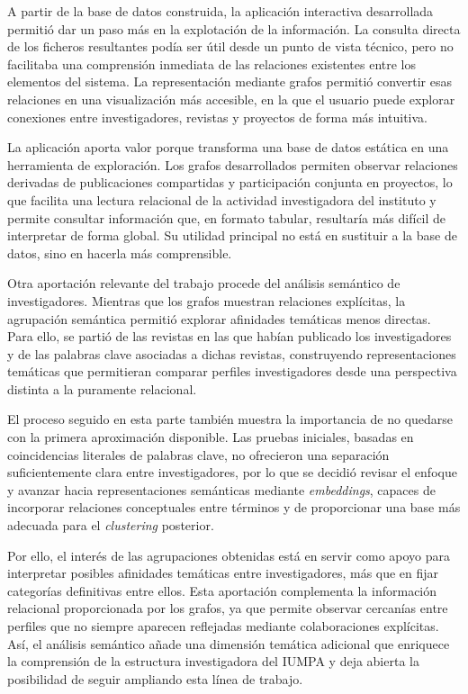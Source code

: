 \documentclass[11pt,spanish,listoffigures,listoftables]{tfgetsinf}
\begin{document}
A partir de la base de datos construida, la aplicación interactiva desarrollada permitió dar un paso más en la explotación de la información. La consulta directa de los ficheros resultantes podía ser útil desde un punto de vista técnico, pero no facilitaba una comprensión inmediata de las relaciones existentes entre los elementos del sistema. La representación mediante grafos permitió convertir esas relaciones en una visualización más accesible, en la que el usuario puede explorar conexiones entre investigadores, revistas y proyectos de forma más intuitiva.

La aplicación aporta valor porque transforma una base de datos estática en una herramienta de exploración. Los grafos desarrollados permiten observar relaciones derivadas de publicaciones compartidas y participación conjunta en proyectos, lo que facilita una lectura relacional de la actividad investigadora del instituto y permite consultar información que, en formato tabular, resultaría más difícil de interpretar de forma global. Su utilidad principal no está en sustituir a la base de datos, sino en hacerla más comprensible.

Otra aportación relevante del trabajo procede del análisis semántico de investigadores. Mientras que los grafos muestran relaciones explícitas, la agrupación semántica permitió explorar afinidades temáticas menos directas. Para ello, se partió de las revistas en las que habían publicado los investigadores y de las palabras clave asociadas a dichas revistas, construyendo representaciones temáticas que permitieran comparar perfiles investigadores desde una perspectiva distinta a la puramente relacional.

El proceso seguido en esta parte también muestra la importancia de no quedarse con la primera aproximación disponible. Las pruebas iniciales, basadas en coincidencias literales de palabras clave, no ofrecieron una separación suficientemente clara entre investigadores, por lo que se decidió revisar el enfoque y avanzar hacia representaciones semánticas mediante \textit{embeddings}, capaces de incorporar relaciones conceptuales entre términos y de proporcionar una base más adecuada para el \textit{clustering} posterior.

Por ello, el interés de las agrupaciones obtenidas está en servir como apoyo para interpretar posibles afinidades temáticas entre investigadores, más que en fijar categorías definitivas entre ellos. Esta aportación complementa la información relacional proporcionada por los grafos, ya que permite observar cercanías entre perfiles que no siempre aparecen reflejadas mediante colaboraciones explícitas. Así, el análisis semántico añade una dimensión temática adicional que enriquece la comprensión de la estructura investigadora del IUMPA y deja abierta la posibilidad de seguir ampliando esta línea de trabajo.
\end{document}
